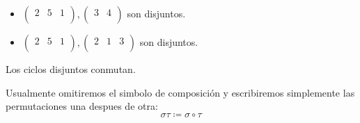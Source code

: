 \begin{example}
	\begin{itemize}
		\item \(\begin{pmatrix}
			      2 & 5 & 1 \\
		      \end{pmatrix}, \begin{pmatrix}
			      3 & 4 \\
		      \end{pmatrix} \) son disjuntos.
		\item \(\begin{pmatrix}
			      2 & 5 & 1 \\
		      \end{pmatrix}, \begin{pmatrix}
			      2 & 1 & 3 \\
		      \end{pmatrix} \) son disjuntos.
	\end{itemize}
\end{example}
\begin{remark}
	Los ciclos disjuntos conmutan.
\end{remark}
Usualmente omitiremos el simbolo de composición y escribiremos simplemente las permutaciones una despues de otra:
\[
	\sigma \tau \coloneqq \sigma \circ \tau
\]


